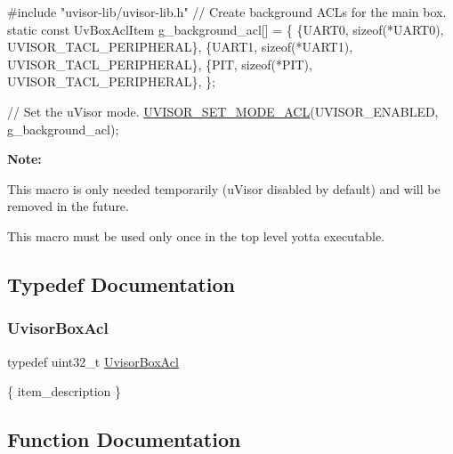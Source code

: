 \begin{DoxyCode}
\textcolor{preprocessor}{#include "uvisor-lib/uvisor-lib.h"}
\textcolor{comment}{// Create background ACLs for the main box. }
\textcolor{keyword}{static} \textcolor{keyword}{const} UvBoxAclItem g\_background\_acl[] = \{
  \{UART0,       \textcolor{keyword}{sizeof}(*UART0), UVISOR\_TACL\_PERIPHERAL\},
  \{UART1,       \textcolor{keyword}{sizeof}(*UART1), UVISOR\_TACL\_PERIPHERAL\},
  \{PIT,         \textcolor{keyword}{sizeof}(*PIT),   UVISOR\_TACL\_PERIPHERAL\},
\};

\textcolor{comment}{// Set the uVisor mode. }
\hyperlink{group__hypervisor_gae90f548ce110da855610f79301aafe34}{UVISOR\_SET\_MODE\_ACL}(UVISOR\_ENABLED, g\_background\_acl);
\end{DoxyCode}


{\bfseries Note\+:}


\begin{DoxyEnumerate}
\item This macro is only needed temporarily (u\+Visor disabled by default) and will be removed in the future.
\item This macro must be used only once in the top level yotta executable. 
\end{DoxyEnumerate}

\subsection{Typedef Documentation}
\hypertarget{group__hypervisor_ga1527b3a7e3df3007490669cbd26b4fe9}{}\label{group__hypervisor_ga1527b3a7e3df3007490669cbd26b4fe9} 
\subsubsection{\texorpdfstring{Uvisor\+Box\+Acl}{UvisorBoxAcl}}
{\footnotesize\ttfamily typedef uint32\+\_\+t \hyperlink{group__hypervisor_ga1527b3a7e3df3007490669cbd26b4fe9}{Uvisor\+Box\+Acl}}

\{ item\+\_\+description \} 

\subsection{Function Documentation}
\hypertarget{group__hypervisor_ga6e7f7b03367daefa2cbcb7e4f0538ba7}{}\label{group__hypervisor_ga6e7f7b03367daefa2cbcb7e4f0538ba7} 

